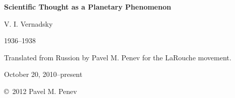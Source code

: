 \begin{titlepage}

\begin{center}
\Huge\textbf{Scientific Thought as a Planetary Phenomenon}


\bigskip
\LARGE{V. I. Vernadsky}

\Large{1936--1938}


\bigskip
\Large{Translated from Russion by Pavel M. Penev for the LaRouche movement.}
\foreignlanguage{russian}{\nocite{vernadsky1938thought-lib.ru}}

October 20, 2010--present

\vfill

\copyright\ 2012 Pavel M. Penev

\end{center}

\end{titlepage}
